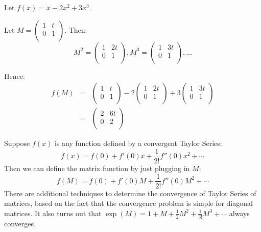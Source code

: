 \begin{example}
Let $f(x) = x - 2x^2 + 3x^3$.

Let $M=\begin{pmatrix}
1 & t \\
0 & 1 \\
\end{pmatrix}$.  Then:
\[
M^2 = \begin{pmatrix}
1 & 2t \\
0 & 1 \\
\end{pmatrix},
M^3 = \begin{pmatrix}
1 & 3t \\
0 & 1 \\
\end{pmatrix}, \ldots
\]

Hence:
\begin{eqnarray*}
f(M) &=& \begin{pmatrix}
	1 & t \\
	0 & 1 \\
	\end{pmatrix} 
- 2 \begin{pmatrix}
	1 & 2t \\
	0 & 1 \\
	\end{pmatrix} 
+ 3 \begin{pmatrix}
	1 & 3t \\
	0 & 1 \\
	\end{pmatrix} \\
&=& \begin{pmatrix}
	2 & 6t \\
	0 & 2 \\
	\end{pmatrix}
\end{eqnarray*}
\end{example}

Suppose $f(x)$ is any function defined by a convergent Taylor Series:
\[
f(x) = f(0) + f'(0)x + \frac{1}{2!}f''(0)x^2 + \cdots
\]
Then we can define the matrix function by just plugging in $M$:
\[
f(M) = f(0) + f'(0)M + \frac{1}{2!}f''(0)M^2 + \cdots
\]
There are additional techniques to determine the convergence of Taylor Series of matrices, based on the fact that the convergence problem is simple for diagonal matrices.  It also turns out that $\exp (M) = 1 + M + \frac{1}{2}M^2 + \frac{1}{3!}M^3 + \cdots$ always converges.




